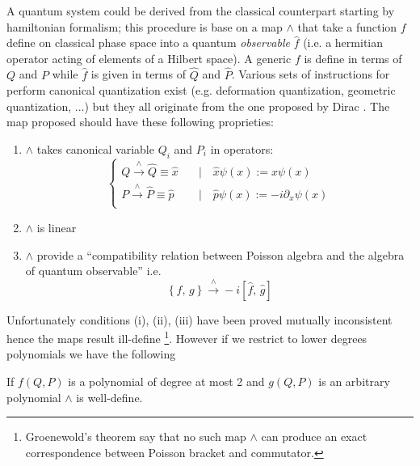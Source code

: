 A quantum system could be derived from the classical counterpart starting by
hamiltonian formalism; this procedure is base on a map $\wedge$ that take a
function $f$ define on classical phase space into a quantum \emph{observable}
$\hat{f}$ (i.e. a hermitian operator acting of elements of a Hilbert space). A
generic $f$ is define in terms of $Q$ and $P$ while $\hat{f}$ is given in terms
of $\hat{Q}$ and $ \hat{P}$.
Various sets of instructions for perform canonical quantization exist (e.g.
deformation quantization, geometric quantization, ...) but they all originate
from the one proposed by Dirac \cite{Dirac25}. The map proposed should have
these following proprieties:
\begin{enumerate}[label=(\roman*)]
  \item $\wedge$ takes canonical variable $Q_i$ and $P_i$ in operators:
    \begin{equation*}
      \begin{cases}
        Q \xrightarrow{\wedge} \hat{Q} \equiv \hat{x}
        \quad &\mid \quad \hat{x} \psi(x) := x \psi(x) \\
        P \xrightarrow{\wedge} \hat{P} \equiv \hat{p}
        \quad &\mid \quad \hat{p} \psi(x) := -i \partial_x \psi(x) \\
      \end{cases}
    \end{equation*}
  \item $\wedge$ is linear
  \item $\wedge$ provide a ``compatibility relation between Poisson algebra and
    the algebra of quantum observable'' i.e.
    \begin{equation*}
      \left\{ f, \, g \right\} \xrightarrow{\wedge}
      -i \left[ \hat{f}, \, \hat{g} \right]
    \end{equation*}
\end{enumerate}
Unfortunately conditions (i), (ii), (iii) have been proved mutually inconsistent
hence the maps result ill-define
\footnote{
  Groenewold's theorem say that no such map $\wedge$ can produce an exact
  correspondence between Poisson bracket and commutator.
}.
However if we restrict to lower degrees polynomials we have the following

\begin{theorem} \label{th:2nd_deegree_poli_canonical_quantization}
  \cite{Hall13} If $f(Q,P)$ is a polynomial of degree at most 2 and $g(Q,P)$ is
  an arbitrary polynomial $\wedge$ is well-define.
\end{theorem}

